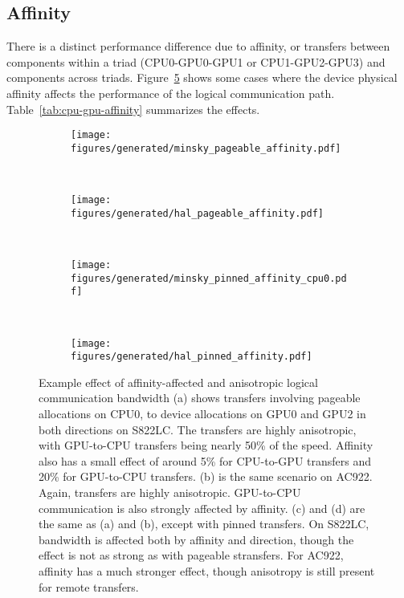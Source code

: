 \subsection{Affinity}
\label{sec:explicit-cpu-gpu-affinity}

There is a distinct performance difference due to affinity, or transfers between components within a triad (CPU0-GPU0-GPU1 or CPU1-GPU2-GPU3) and components across triads.
Figure~\ref{fig:cpu-gpu-affinity-direction} shows some cases where the device physical affinity affects the performance of the logical communication path.
Table~\ref{tab:cpu-gpu-affinity} summarizes the effects.

\begin{figure}[ht]
    \centering
    \begin{subfigure}[b]{0.45\textwidth}
        \texttt{[image: figures/generated/minsky\_pageable\_affinity.pdf]}
        \caption{}
        \label{fig:minsky_pageable_affinity}
    \end{subfigure}
    ~
    \begin{subfigure}[b]{0.45\textwidth}
        \texttt{[image: figures/generated/hal\_pageable\_affinity.pdf]}
        \caption{}
        \label{fig:hal_pageable_affinity}
    \end{subfigure}
    \\
    \begin{subfigure}[b]{0.45\textwidth}
        \texttt{[image: figures/generated/minsky\_pinned\_affinity\_cpu0.pdf]}
        \caption{}
        \label{fig:minsky_pinned_affinity}
    \end{subfigure}
    ~
    \begin{subfigure}[b]{0.45\textwidth}
        \texttt{[image: figures/generated/hal\_pinned\_affinity.pdf]}
        \caption{}
        \label{fig:hal_pinned_affinity}
    \end{subfigure}
    \caption[]{
    Example effect of affinity-affected and anisotropic logical communication bandwidth
    (a) shows transfers involving pageable allocations on CPU0, to device allocations on GPU0 and GPU2 in both directions on S822LC.
    The transfers are highly anisotropic, with GPU-to-CPU transfers being nearly 50\% of the speed.
    Affinity also has a small effect of around 5\% for CPU-to-GPU transfers and 20\% for GPU-to-CPU transfers.
    (b) is the same scenario on AC922.
    Again, transfers are highly anisotropic. GPU-to-CPU communication is also strongly affected by affinity.
    (c) and (d) are the same as (a) and (b), except with pinned transfers.
    On S822LC, bandwidth is affected both by affinity and direction, though the effect is not as strong as with pageable stransfers.
    For AC922, affinity has a much stronger effect, though anisotropy is still present for remote transfers.
    }
    \label{fig:cpu-gpu-affinity-direction}
\end{figure}


